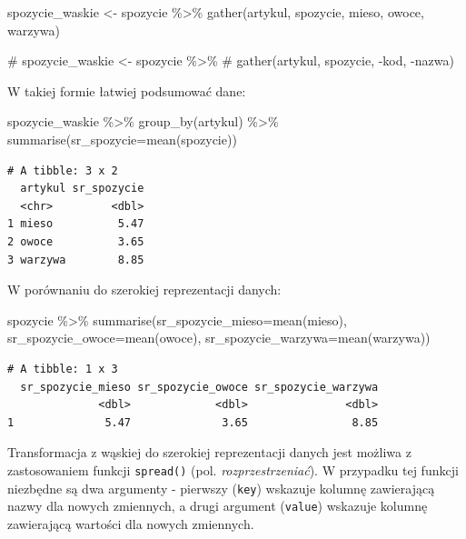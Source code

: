 \documentclass[
  letterpaper,
  DIV=11,
  numbers=noendperiod]{scrreprt}
\newenvironment{Shaded}{\begin{snugshade}}{\end{snugshade}}
\newcommand{\AttributeTok}[1]{\textcolor[rgb]{0.40,0.45,0.13}{#1}}
\newcommand{\CommentTok}[1]{\textcolor[rgb]{0.37,0.37,0.37}{#1}}
\newcommand{\FunctionTok}[1]{\textcolor[rgb]{0.28,0.35,0.67}{#1}}
\newcommand{\NormalTok}[1]{\textcolor[rgb]{0.00,0.23,0.31}{#1}}
\newcommand{\OtherTok}[1]{\textcolor[rgb]{0.00,0.23,0.31}{#1}}
\newcommand{\SpecialCharTok}[1]{\textcolor[rgb]{0.37,0.37,0.37}{#1}}
\begin{document}
\begin{Shaded}
\begin{Highlighting}[]
\NormalTok{spozycie\_waskie }\OtherTok{\textless{}{-}}\NormalTok{ spozycie }\SpecialCharTok{\%\textgreater{}\%}
  \FunctionTok{gather}\NormalTok{(artykul, spozycie, mieso, owoce, warzywa)}

\CommentTok{\# spozycie\_waskie \textless{}{-} spozycie \%\textgreater{}\%}
\CommentTok{\#   gather(artykul, spozycie, {-}kod, {-}nazwa)}
\end{Highlighting}
\end{Shaded}

W takiej formie łatwiej podsumować dane:

\begin{Shaded}
\begin{Highlighting}[]
\NormalTok{spozycie\_waskie }\SpecialCharTok{\%\textgreater{}\%}
  \FunctionTok{group\_by}\NormalTok{(artykul) }\SpecialCharTok{\%\textgreater{}\%}
  \FunctionTok{summarise}\NormalTok{(}\AttributeTok{sr\_spozycie=}\FunctionTok{mean}\NormalTok{(spozycie))}
\end{Highlighting}
\end{Shaded}

\begin{verbatim}
# A tibble: 3 x 2
  artykul sr_spozycie
  <chr>         <dbl>
1 mieso          5.47
2 owoce          3.65
3 warzywa        8.85
\end{verbatim}

W porównaniu do szerokiej reprezentacji danych:

\begin{Shaded}
\begin{Highlighting}[]
\NormalTok{spozycie }\SpecialCharTok{\%\textgreater{}\%}
  \FunctionTok{summarise}\NormalTok{(}\AttributeTok{sr\_spozycie\_mieso=}\FunctionTok{mean}\NormalTok{(mieso),}
            \AttributeTok{sr\_spozycie\_owoce=}\FunctionTok{mean}\NormalTok{(owoce),}
            \AttributeTok{sr\_spozycie\_warzywa=}\FunctionTok{mean}\NormalTok{(warzywa))}
\end{Highlighting}
\end{Shaded}

\begin{verbatim}
# A tibble: 1 x 3
  sr_spozycie_mieso sr_spozycie_owoce sr_spozycie_warzywa
              <dbl>             <dbl>               <dbl>
1              5.47              3.65                8.85
\end{verbatim}

Transformacja z wąskiej do szerokiej reprezentacji danych jest możliwa z
zastosowaniem funkcji \texttt{spread()} (pol. \emph{rozprzestrzeniać}).
W przypadku tej funkcji niezbędne są dwa argumenty - pierwszy
(\texttt{key}) wskazuje kolumnę zawierającą nazwy dla nowych zmiennych,
a drugi argument (\texttt{value}) wskazuje kolumnę zawierającą wartości
dla nowych zmiennych.
\end{document}
